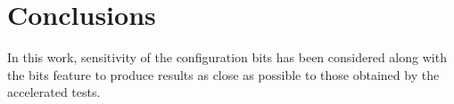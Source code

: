 %
%
%
%
%
%
%
%
%
%
%
%
%
%
%
%
%
%
%
\section{Conclusions}


In this work, sensitivity of the configuration bits has been considered along with the bits feature to
produce results as close as possible to those obtained by the accelerated tests. 



\label{Conclusion}

